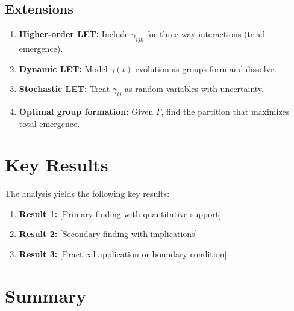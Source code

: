 \subsection{Extensions}

\begin{enumerate}
\item \textbf{Higher-order LET:} Include $\gamma_{ijk}$ for three-way
interactions (triad emergence).

\item \textbf{Dynamic LET:} Model $\gamma(t)$ evolution as groups form
and dissolve.

\item \textbf{Stochastic LET:} Treat $\gamma_{ij}$ as random variables
with uncertainty.

\item \textbf{Optimal group formation:} Given $\Gamma$, find the
partition that maximizes total emergence.
\end{enumerate}



\section{Key Results}
\label{sec:let-results}

The analysis yields the following key results:

\begin{enumerate}
    \item \textbf{Result 1:} [Primary finding with quantitative support]
    \item \textbf{Result 2:} [Secondary finding with implications]
    \item \textbf{Result 3:} [Practical application or boundary condition]
\end{enumerate}


\section{Summary}
\label{sec:let-summary}

